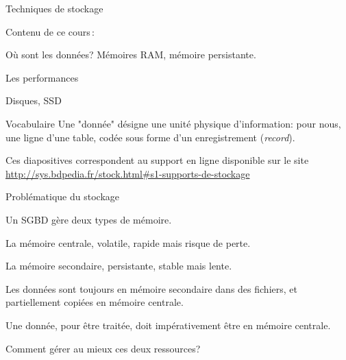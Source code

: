 


\begin{frame}[fragile]{Techniques de stockage}

Contenu de ce cours\,:

\begin{redbullet}
   \item Où sont les données? Mémoires RAM, mémoire persistante.


  \item Les performances 

  \item Disques, SSD
\end{redbullet}

\vfill

\begin{beamerboxesrounded}{Vocabulaire}
Une "donnée" désigne une unité physique d'information: pour nous, une ligne d'une table,
codée sous forme d'un enregistrement (\textit{record}).
\end{beamerboxesrounded}

\vfill


\begin{blocgauche}
\alert{Ces diapositives correspondent au support en ligne disponible sur
le site \url{http://sys.bdpedia.fr/stock.html\#s1-supports-de-stockage}}
\end{blocgauche}

\end{frame}



\begin{frame}{Problématique du stockage}

Un SGBD gère deux types de mémoire.

\begin{redbullet}
  \item La mémoire centrale, \alert{volatile}, rapide mais risque de perte.
  \item La mémoire secondaire, \alert{persistante}, stable mais lente.
\end{redbullet}

Les données sont \alert{toujours} en mémoire secondaire dans
des fichiers, et \alert{partiellement} copiées en mémoire centrale.

\vfill

\begin{blocgauche}
Une donnée, pour être traitée, doit impérativement être en mémoire centrale.

\medskip

Comment gérer au mieux ces deux ressources?
\end{blocgauche}
\end{frame}


